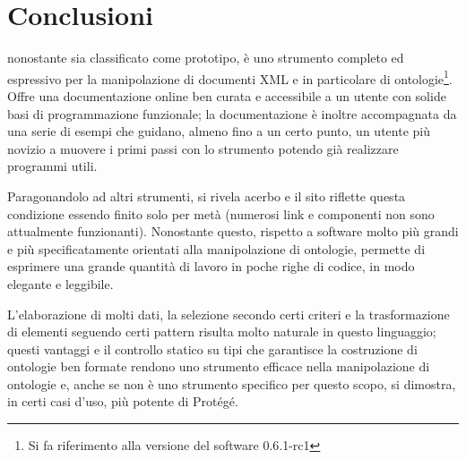 \section{Conclusioni}
\cduce nonostante sia classificato come prototipo, è uno strumento completo ed espressivo per la manipolazione di documenti XML e in particolare di ontologie\footnote{Si fa riferimento alla versione del software 0.6.1-rc1}. Offre una documentazione online ben curata e accessibile a un utente con solide basi di programmazione funzionale; la documentazione è inoltre accompagnata da una serie di esempi che guidano, almeno fino a un certo punto, un utente più novizio a muovere i primi passi con lo strumento potendo già realizzare programmi utili.

Paragonandolo ad altri strumenti, si rivela acerbo e il sito riflette questa condizione essendo finito solo per metà (numerosi link e componenti non sono attualmente funzionanti). Nonostante questo, rispetto a software molto più grandi e più specificatamente orientati alla manipolazione di ontologie, \cduce permette di esprimere una grande quantità di lavoro in poche righe di codice, in modo elegante e leggibile. 

L'elaborazione di molti dati, la selezione secondo certi criteri e la trasformazione di elementi seguendo certi pattern risulta molto naturale in questo linguaggio; questi vantaggi e il controllo statico su tipi che garantisce la costruzione di ontologie ben formate rendono \cduce uno strumento efficace nella manipolazione di ontologie e, anche se non è uno strumento specifico per questo scopo, si dimostra, in certi casi d'uso, più potente di Protégé. 